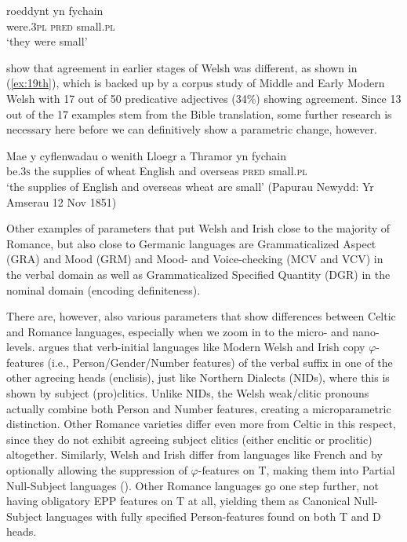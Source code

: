 \documentclass[output=paper,colorlinks,citecolor=brown]{langscibook}
\begin{document}
\ea 
\settowidth{}
\gll roeddynt yn fychain \\
were.\textsc{3pl} \textsc{pred} small.\textsc{pl}\\ 
\glt `they were small' 
\label{ex:small}
\z

\noindent \citet{mm:meelen_adjectival_2020} show that agreement in earlier stages of Welsh was different, as shown in (\ref{ex:19th}), which is backed up by a corpus study of Middle and Early Modern Welsh with 17 out of 50 predicative adjectives (34\%) showing agreement. Since 13 out of the 17 examples stem from the Bible translation, some further research is necessary here before we can definitively show a parametric change, however.

\ea
\gll Mae y cyflenwadau o wenith Lloegr a Thramor yn fychain\\
be.\textsc{3s} the supplies of wheat English and overseas \textsc{pred} small.\textsc{pl}\\
\glt `the supplies of English and overseas wheat are small' (Papurau Newydd: Yr Amserau 12 Nov 1851)
\label{ex:19th}
\z

\noindent Other examples of parameters that put Welsh and Irish close to the majority of Romance, but also close to Germanic languages are Grammaticalized Aspect (GRA) and Mood (GRM) and Mood- and Voice-checking (MCV and VCV) in the verbal domain as well as Grammaticalized Specified Quantity (DGR) in the nominal domain (encoding definiteness).

There are, however, also various parameters that show differences between Celtic and Romance languages, especially when we zoom in to the micro- and nano-levels. \citet{mm:roberts_parameter_2019} argues that verb-initial languages like Modern Welsh and Irish copy $\varphi$-features (i.e., Person/Gender/Number features) of the verbal suffix in one of the other agreeing heads (enclisis), just like Northern  Dialects (NIDs), where this is shown by subject (pro)clitics. Unlike NIDs, the Welsh weak/clitic pronouns actually combine both Person and Number features, creating a microparametric distinction. Other Romance varieties differ even more from Celtic in this respect, since they do not exhibit agreeing subject clitics (either enclitic or proclitic) altogether. Similarly, Welsh and Irish differ from languages like French and  by optionally allowing the suppression of $\varphi$-features on T, making them into Partial Null-Subject languages (\cite[608]{mm:roberts_parameter_2019}). Other Romance languages go one step further, not having obligatory EPP features on T at all, yielding them as Canonical Null-Subject languages with fully specified Person-features found on both T and D heads.
\end{document}
